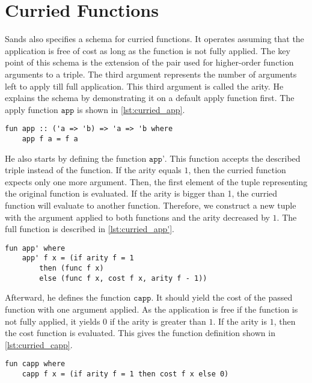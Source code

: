 
\section{Curried Functions} \label{chapter:rel_curried}

Sands also specifies a schema for curried functions.
It operates assuming that the application is free of cost as long as the function is not fully applied.
The key point of this schema is the extension of the pair used for higher-order function arguments to a triple.
The third argument represents the number of arguments left to apply till full application.
This third argument is called the arity.
He explains the schema by demonstrating it on a default apply function first.
The apply function $\texttt{app}$ is shown in \autoref{lst:curried_app}.
\begin{lstlisting}[language=isabelle,mathescape=true,caption=Apply function,label=lst:curried_app]
  fun app :: ('a => 'b) => 'a => 'b where
    app f a = f a
\end{lstlisting}

He also starts by defining the function $\texttt{app'}$.
This function accepts the described triple instead of the function.
If the arity equals $1$, then the curried function expects only one more argument.
Then, the first element of the tuple representing the original function is evaluated.
If the arity is bigger than 1, the curried function will evaluate to another function.
Therefore, we construct a new tuple with the argument applied to both functions and the arity decreased by $1$.
The full function is described in \autoref{lst:curried_app'}.
\begin{lstlisting}[language=isabelle,mathescape=true,label=lst:curried_app',caption=Apply function on function argument triple]
  fun app' where
    app' f x = (if arity f = 1
        then (func f x)
        else (func f x, cost f x, arity f - 1))
\end{lstlisting}

Afterward, he defines the function $\texttt{capp}$.
It should yield the cost of the passed function with one argument applied.
As the application is free if the function is not fully applied, it yields $0$ if the arity is greater than $1$.
If the arity is $1$, then the cost function is evaluated.
This gives the function definition shown in \autoref{lst:curried_capp}.
\begin{lstlisting}[language=isabelle,mathescape=true,caption=Timing function of apply function,label=lst:curried_capp]
  fun capp where
    capp f x = (if arity f = 1 then cost f x else 0)
\end{lstlisting}

